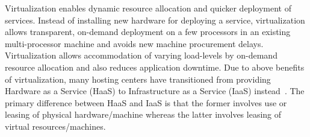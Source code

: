 

Virtualization enables dynamic resource allocation and quicker deployment
of services. Instead of installing new hardware for deploying a service,
virtualization allows transparent, on-demand deployment
on a few
processors in an existing multi-processor machine and avoids new machine
procurement delays. %
Virtualization allows accommodation of varying load-levels by
on-demand resource allocation %
and also reduces application downtime. %
Due to above benefits of virtualization,
many hosting centers have transitioned from providing 
Hardware as a Service (HaaS) to 
Infrastructure as a Service (IaaS) instead~\cite{ec2}.
The primary difference between HaaS and IaaS is that the
former involves use or leasing of physical
hardware/machine whereas the latter involves
leasing of virtual resources/machines.

